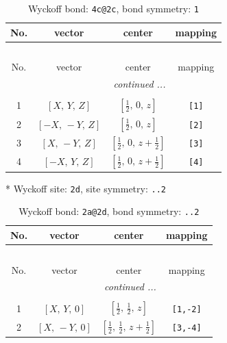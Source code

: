 \documentclass[fleqn,8pt]{jsarticle}
\begin{document}
\begin{longtable}{cccc}
\caption{Wyckoff bond: {\tt 4c@2c}, bond symmetry: {\tt 1}}
 \\
 \hline \hline
No. & vector & center & mapping \\ \hline \endfirsthead

\multicolumn{3}{l}{\tablename\ \thetable{}} \\
 \hline \hline
No. & vector & center & mapping \\ \hline \endhead

 \hline \hline
\multicolumn{3}{r}{\footnotesize\it continued ...} \\ \endfoot

 \hline \hline
\multicolumn{3}{r}{} \\ \endlastfoot

1 & $\left[ X,\, Y,\, Z \right]$ & $\left[ \frac{1}{2},\, 0,\, z \right]$ & {\tt [1]} \\ \hline
2 & $\left[ - X,\, - Y,\, Z \right]$ & $\left[ \frac{1}{2},\, 0,\, z \right]$ & {\tt [2]} \\ \hline
3 & $\left[ X,\, - Y,\, Z \right]$ & $\left[ \frac{1}{2},\, 0,\, z + \frac{1}{2} \right]$ & {\tt [3]} \\ \hline
4 & $\left[ - X,\, Y,\, Z \right]$ & $\left[ \frac{1}{2},\, 0,\, z + \frac{1}{2} \right]$ & {\tt [4]} \\
\end{longtable}
* Wyckoff site: {\tt 2d}, site symmetry: {\tt ..2}
\renewcommand{\arraystretch}{1.2}
\begin{longtable}{cccc}
\caption{Wyckoff bond: {\tt 2a@2d}, bond symmetry: {\tt ..2}}
 \\
 \hline \hline
No. & vector & center & mapping \\ \hline \endfirsthead

\multicolumn{3}{l}{\tablename\ \thetable{}} \\
 \hline \hline
No. & vector & center & mapping \\ \hline \endhead

 \hline \hline
\multicolumn{3}{r}{\footnotesize\it continued ...} \\ \endfoot

 \hline \hline
\multicolumn{3}{r}{} \\ \endlastfoot

1 & $\left[ X,\, Y,\, 0 \right]$ & $\left[ \frac{1}{2},\, \frac{1}{2},\, z \right]$ & {\tt [1,-2]} \\ \hline
2 & $\left[ X,\, - Y,\, 0 \right]$ & $\left[ \frac{1}{2},\, \frac{1}{2},\, z + \frac{1}{2} \right]$ & {\tt [3,-4]} \\
\end{longtable}
\end{document}
